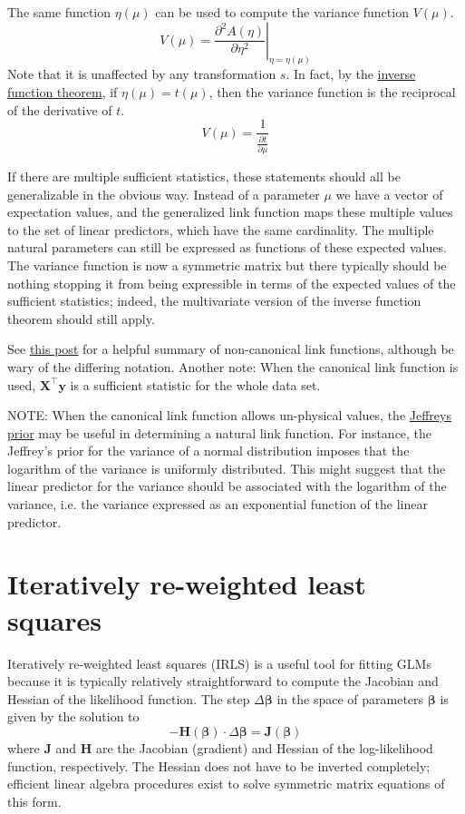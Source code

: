 \documentclass{article}
\newcommand{\bbeta}{\boldsymbol{\beta}}
\begin{document}
The same function \(\eta(\mu)\) can be used to compute the variance function
\(V(\mu)\).
\[ V(\mu) = \left. \frac{\partial^2 A(\eta)}{\partial \eta^2} \right|_{\eta = \eta(\mu)} \]
Note that it is unaffected by any transformation \(s\).
In fact, by the \href{https://en.wikipedia.org/wiki/Inverse_function_theorem}{inverse function
theorem}, if
\(\eta(\mu) = t(\mu)\), then the variance function is the reciprocal of the
derivative of \(t\).
\[ V(\mu) = \frac{1}{\frac{\partial t}{\partial \mu}} \]

If there are multiple sufficient statistics, these statements should all be
generalizable in the obvious way.
Instead of a parameter \(\mu\) we have a vector of expectation values, and the
generalized link function maps these multiple values to the set of linear
predictors, which have the same cardinality.
The multiple natural parameters can still be expressed as functions of these
expected values.
The variance function is now a symmetric matrix but there typically should be
nothing stopping it from being expressible in terms of the expected values of
the sufficient statistics; indeed, the multivariate version of the inverse
function theorem should still apply.

See \href{https://stats.stackexchange.com/questions/40876/what-is-the-difference-between-a-link-function-and-a-canonical-link-function}{this post}
for a helpful summary of non-canonical link functions, although be wary of the
differing notation.
Another note: When the canonical link function is used, \(\mathbf{X}^\intercal
\mathbf{y}\) is a sufficient statistic for the whole data set.

NOTE: When the canonical link function allows un-physical values, the
\href{https://en.wikipedia.org/wiki/Jeffreys_prior}{Jeffreys prior} may be
useful in determining a natural link function. For instance, the Jeffrey's
prior for the variance of a normal distribution imposes that the logarithm of
the variance is uniformly distributed. This might suggest that the linear
predictor for the variance should be associated with the logarithm of the
variance, i.e. the variance expressed as an exponential function of the linear
predictor.


\section{Iteratively re-weighted least squares}

Iteratively re-weighted least squares (IRLS) is a useful tool for fitting GLMs
because it is typically relatively straightforward to compute the Jacobian and
Hessian of the likelihood function. The step \(\Delta \bbeta\) in
the space of parameters \(\bbeta\) is given by the solution to
\[ -\mathbf{H}(\bbeta) \cdot \Delta\bbeta = \mathbf{J}(\bbeta) \]
where \(\mathbf{J}\) and \(\mathbf{H}\) are the Jacobian (gradient) and
Hessian of the log-likelihood function, respectively. The Hessian does not have
to be inverted completely; efficient linear algebra procedures exist to solve
symmetric matrix equations of this form.
\end{document}
